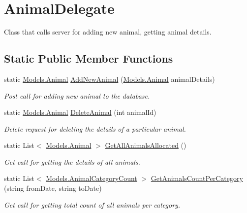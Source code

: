 \hypertarget{classWildlifeTrackingApp_1_1Delegates_1_1AnimalDelegate}{}\section{Animal\+Delegate}
\label{classWildlifeTrackingApp_1_1Delegates_1_1AnimalDelegate}


Class that calls server for adding new animal, getting animal details.  


\subsection*{Static Public Member Functions}
\begin{DoxyCompactItemize}
\item 
static \hyperlink{classWildlifeTrackingApp_1_1Models_1_1Animal}{Models.\+Animal} \hyperlink{classWildlifeTrackingApp_1_1Delegates_1_1AnimalDelegate_a57a5b0f9728b68e90dd1aa38ebd9df14}{Add\+New\+Animal} (\hyperlink{classWildlifeTrackingApp_1_1Models_1_1Animal}{Models.\+Animal} animal\+Details)
\begin{DoxyCompactList}\small\item\em Post call for adding new animal to the database. \end{DoxyCompactList}\item 
static \hyperlink{classWildlifeTrackingApp_1_1Models_1_1Animal}{Models.\+Animal} \hyperlink{classWildlifeTrackingApp_1_1Delegates_1_1AnimalDelegate_a9261f08d6ea296a3ea3b63256c299770}{Delete\+Animal} (int animal\+Id)
\begin{DoxyCompactList}\small\item\em Delete request for deleting the details of a particular animal. \end{DoxyCompactList}\item 
static List$<$ \hyperlink{classWildlifeTrackingApp_1_1Models_1_1Animal}{Models.\+Animal} $>$ \hyperlink{classWildlifeTrackingApp_1_1Delegates_1_1AnimalDelegate_acdcd9b138229c5e197e45cdad4025bad}{Get\+All\+Animals\+Allocated} ()
\begin{DoxyCompactList}\small\item\em Get call for getting the details of all animals. \end{DoxyCompactList}\item 
static List$<$ \hyperlink{classWildlifeTrackingApp_1_1Models_1_1AnimalCategoryCount}{Models.\+Animal\+Category\+Count} $>$ \hyperlink{classWildlifeTrackingApp_1_1Delegates_1_1AnimalDelegate_a2fd0ae1a6560b820addb282b1e6e4ad3}{Get\+Animals\+Count\+Per\+Category} (string from\+Date, string to\+Date)
\begin{DoxyCompactList}\small\item\em Get call for getting total count of all animals per category. \end{DoxyCompactList}\end{DoxyCompactItemize}


